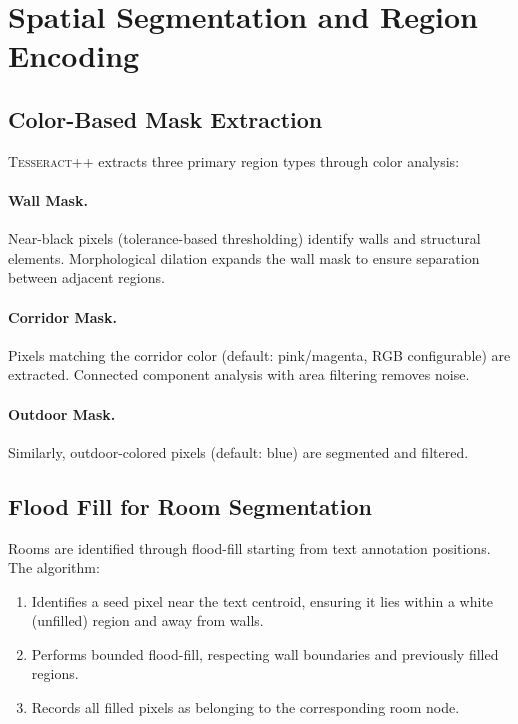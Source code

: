 \documentclass[manuscript,screen,review]{acmart}
\newcommand{\tesseract}{\textsc{Tesseract++}}
\begin{document}
\section{Spatial Segmentation and Region Encoding}
\label{sec:segmentation}

\subsection{Color-Based Mask Extraction}
\label{subsec:masks}

\tesseract{} extracts three primary region types through color analysis:

\paragraph{Wall Mask.} Near-black pixels (tolerance-based thresholding) identify walls and structural elements. Morphological dilation expands the wall mask to ensure separation between adjacent regions.

\paragraph{Corridor Mask.} Pixels matching the corridor color (default: pink/magenta, RGB configurable) are extracted. Connected component analysis with area filtering removes noise.

\paragraph{Outdoor Mask.} Similarly, outdoor-colored pixels (default: blue) are segmented and filtered.

\subsection{Flood Fill for Room Segmentation}
\label{subsec:floodfill}

Rooms are identified through flood-fill starting from text annotation positions. The algorithm:

\begin{enumerate}
    \item Identifies a seed pixel near the text centroid, ensuring it lies within a white (unfilled) region and away from walls.
    \item Performs bounded flood-fill, respecting wall boundaries and previously filled regions.
    \item Records all filled pixels as belonging to the corresponding room node.
\end{enumerate}
\end{document}
